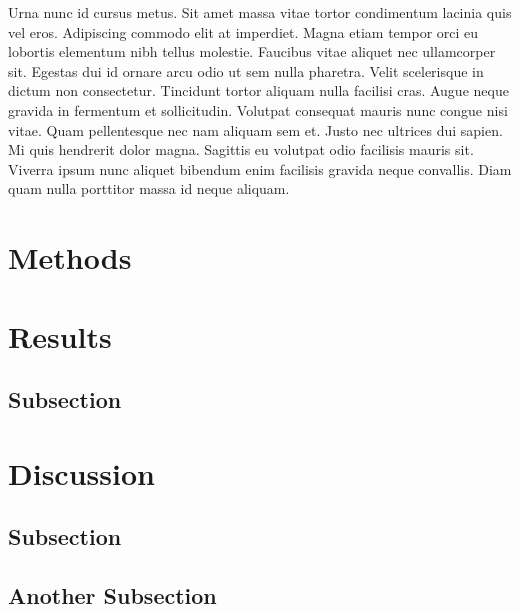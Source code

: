 \documentclass[
11pt
twocolumn
]{article}
\begin{document}
Urna nunc id cursus metus. Sit amet massa vitae tortor condimentum
lacinia quis vel eros. Adipiscing commodo elit at imperdiet. Magna etiam
tempor orci eu lobortis elementum nibh tellus molestie. Faucibus vitae
aliquet nec ullamcorper sit. Egestas dui id ornare arcu odio ut sem
nulla pharetra. Velit scelerisque in dictum non consectetur. Tincidunt
tortor aliquam nulla facilisi cras. Augue neque gravida in fermentum et
sollicitudin. Volutpat consequat mauris nunc congue nisi vitae. Quam
pellentesque nec nam aliquam sem et. Justo nec ultrices dui sapien. Mi
quis hendrerit dolor magna. Sagittis eu volutpat odio facilisis mauris
sit. Viverra ipsum nunc aliquet bibendum enim facilisis gravida neque
convallis. Diam quam nulla porttitor massa id neque aliquam.

\hypertarget{methods}{%
\section{Methods}\label{methods}}

\hypertarget{results}{%
\section{Results}\label{results}}

\hypertarget{subsection}{%
\subsection{Subsection}\label{subsection}}

\hypertarget{discussion}{%
\section{Discussion}\label{discussion}}

\hypertarget{subsection-1}{%
\subsection{Subsection}\label{subsection-1}}

\hypertarget{another-subsection}{%
\subsection{Another Subsection}\label{another-subsection}}


\printbibliography
\end{document}
